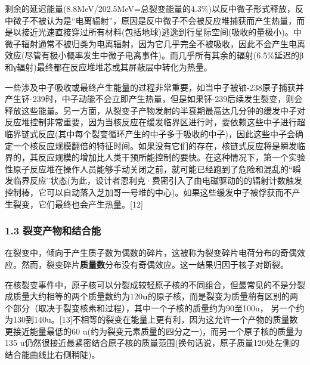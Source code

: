 剩余的延迟能量(8.8MeV/202.5MeV=总裂变能量的4.3\%)以反中微子形式释放，反中微子不被认为是“电离辐射”，原因是反中微子不会被反应堆捕获而产生热量，而是以接近光速直接穿过所有材料(包括地球)逃逸到行星际空间(吸收的量极小)。中微子辐射通常不被归类为电离辐射，因为它几乎完全不被吸收，因此不会产生电离效应(尽管有极小概率发生中微子电离事件)。而几乎所有其余的辐射(6.5\%延迟的β和γ辐射)最终都在反应堆堆芯或其屏蔽层中转化为热量。

一些涉及中子吸收或最终产生能量的过程非常重要，如当中子被铀-238原子捕获并产生钚-239时，中子动能不会立即产生热量，但是如果钚-239后续发生裂变，则会释放这些能量。另一方面，从裂变子产物发射的半衰期最高达几分钟的缓发中子对反应堆控制非常重要，因为当核反应在缓发临界区进行时，要依赖这些中子进行超临界链式反应(其中每个裂变循环产生的中子多于吸收的中子)，因此这些中子会确定一个核反应规模翻倍的特征时间。如果没有它们的存在，核链式反应将是瞬发临界的，其反应规模的增加比人类干预所能控制的要快。在这种情况下，第一个实验性原子反应堆在操作人员能够手动关闭之前，就可能已经跑到了危险和混乱的“瞬发临界反应”状态(为此，设计者恩利克·费密引入了由电磁驱动的的辐射计数触发控制棒，它可以自动落入芝加哥一号堆的中心)。如果这些缓发中子被俘获而不产生裂变，它们最终也会产生热量。[12]

\subsubsection{1.3 裂变产物和结合能}
在裂变中，倾向于产生质子数为偶数的碎片，这被称为裂变碎片电荷分布的奇偶效应。然而，裂变碎片\textbf{质量数}分布没有奇偶效应。这一结果归因于核子对断裂。

在核裂变事件中，原子核可以分裂成较轻原子核的不同组合，但最常见的不是分裂成质量大约相等的两个质量数约为$120\mathbf{u}$的原子核，而是裂变为质量稍有区别的两个部分（取决于裂变核素和过程），其中一个子核的质量约为90至100u， 另一个约为130到140u。[13]不相等的裂变在能量上更有利，因为这允许一个产物的质量数更接近能量最低的60 u(约为裂变元素质量的四分之一)，而另一个原子核的质量为135 u仍然很接近最紧密结合原子核的质量范围(换句话说，原子质量120处左侧的结合能曲线比右侧稍陡)。